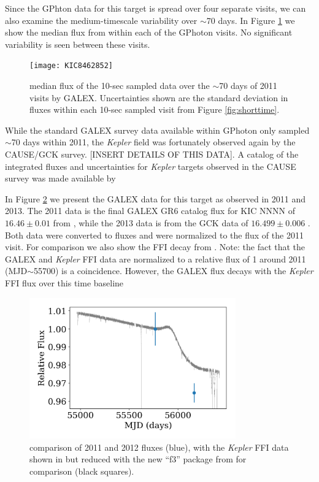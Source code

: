 \documentclass[manuscript, letterpaper]{aastex6}
\makeatletter
\let\origsection\section
\renewcommand\section{\@ifstar{\starsection}{\nostarsection}}
\newcommand\nostarsection[1]{\sectionprelude\origsection{#1}}
\newcommand\starsection[1]{\sectionprelude\origsection*{#1}}
\newcommand\sectionprelude{\vspace{1em}}
\newcommand{\Kepler}{\textsl{Kepler}\xspace}
\makeatother
\begin{document}
Since the GPhton data for this target is spread over four separate visits, we can also examine the medium-timescale variability over $\sim$70 days. In Figure \ref{fig:medtime} we show the median flux from within each of the GPhoton visits. No significant variability is seen between these visits.

\begin{figure}[]
\centering
\texttt{[image: KIC8462852]}
\caption{median flux of the 10-sec sampled data over the $\sim$70 days of 2011 visits by GALEX. Uncertainties shown are the standard deviation in fluxes within each 10-sec sampled visit from Figure \ref{fig:shorttime}.
}
\label{fig:medtime}
\end{figure}





\section{Long Timescale Variability}

While the standard GALEX survey data available within GPhoton only sampled $\sim$70 days within 2011, the \Kepler field was fortunately observed again by the CAUSE/GCK survey. [INSERT DETAILS OF THIS DATA]. A catalog of the integrated fluxes and uncertainties for \Kepler targets observed in the CAUSE survey was made available by \citet{olmedo2015}


In Figure \ref{fig:longtime} we present the GALEX data for this target as observed in 2011 and 2013. The 2011 data is the final GALEX GR6 catalog flux for KIC NNNN of $16.46 \pm 0.01$ from \citet{bianchi2014}, while the 2013 data is from the GCK data of $16.499\pm0.006$ \citet{olmedo2015}. Both data were converted to fluxes and were normalized to the flux of the 2011 visit. For comparison we also show the FFI decay from \citet{montet2016}. Note: the fact that the GALEX and \Kepler FFI data are normalized to a relative flux of 1 around 2011 (MJD$\sim$55700) is a coincidence. However, the GALEX flux decays with the \Kepler FFI flux over this time baseline

\begin{figure}[]
\centering
\includegraphics[width=3.5in]{KIC8462852_compare}
\caption{comparison of 2011 and 2012 fluxes (blue), with the \Kepler FFI data shown in \citet{montet2016} but reduced with the new ``f3'' package from \citet{montet2017} for comparison (black squares).}
\label{fig:longtime}
\end{figure}
\end{document}
